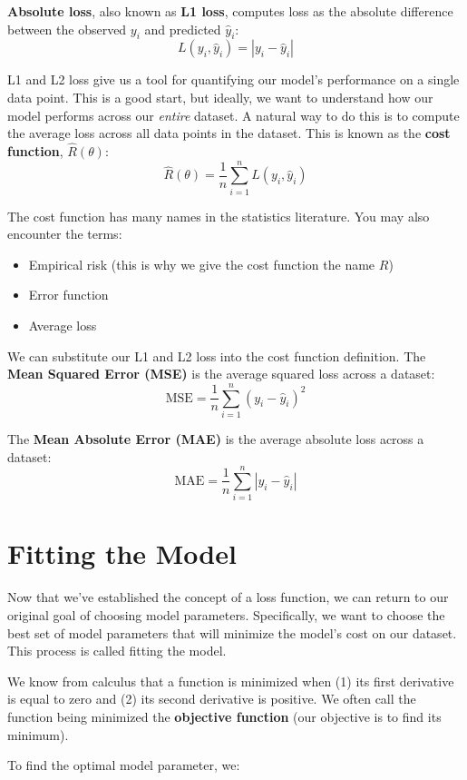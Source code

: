 \documentclass[
  letterpaper,
  DIV=11,
  numbers=noendperiod]{scrreprt}
\providecommand{\tightlist}{%
  \setlength{\itemsep}{0pt}\setlength{\parskip}{0pt}}\usepackage{longtable,booktabs,array}
\begin{document}
\textbf{Absolute loss}, also known as \textbf{L1 loss}, computes loss as
the absolute difference between the observed \(y_i\) and predicted
\(\hat{y}_i\): \[L(y_i, \hat{y}_i) = |y_i - \hat{y}_i|\]

L1 and L2 loss give us a tool for quantifying our model's performance on
a single data point. This is a good start, but ideally, we want to
understand how our model performs across our \emph{entire} dataset. A
natural way to do this is to compute the average loss across all data
points in the dataset. This is known as the \textbf{cost function},
\(\hat{R}(\theta)\):
\[\hat{R}(\theta) = \frac{1}{n} \sum^n_{i=1} L(y_i, \hat{y}_i)\]

The cost function has many names in the statistics literature. You may
also encounter the terms:

\begin{itemize}
\tightlist
\item
  Empirical risk (this is why we give the cost function the name \(R\))
\item
  Error function
\item
  Average loss
\end{itemize}

We can substitute our L1 and L2 loss into the cost function definition.
The \textbf{Mean Squared Error (MSE)} is the average squared loss across
a dataset: \[\text{MSE} = \frac{1}{n} \sum_{i=1}^n (y_i - \hat{y}_i)^2\]

The \textbf{Mean Absolute Error (MAE)} is the average absolute loss
across a dataset:
\[\text{MAE}= \frac{1}{n} \sum_{i=1}^n |y_i - \hat{y}_i|\]

\section{Fitting the Model}\label{fitting-the-model}

Now that we've established the concept of a loss function, we can return
to our original goal of choosing model parameters. Specifically, we want
to choose the best set of model parameters that will minimize the
model's cost on our dataset. This process is called fitting the model.

We know from calculus that a function is minimized when (1) its first
derivative is equal to zero and (2) its second derivative is positive.
We often call the function being minimized the \textbf{objective
function} (our objective is to find its minimum).

To find the optimal model parameter, we:
\end{document}
